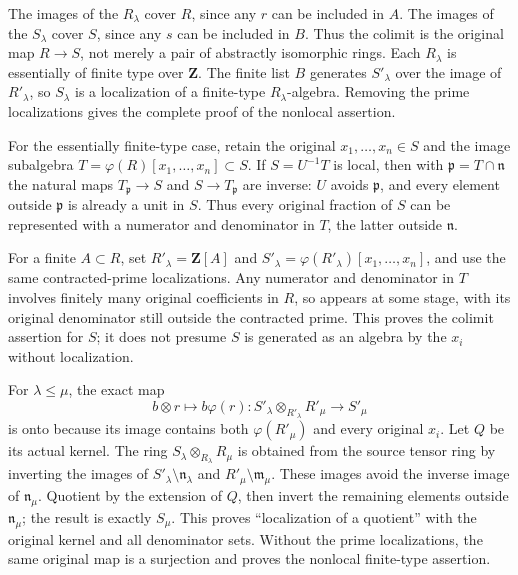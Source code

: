 The images of the \(R_\lambda\) cover \(R\), since any \(r\) can be included in \(A\). The images of the \(S_\lambda\) cover \(S\), since any \(s\) can be included in \(B\). Thus the colimit is the original map \(R\to S\), not merely a pair of abstractly isomorphic rings. Each \(R_\lambda\) is essentially of finite type over \(\mathbf Z\). The finite list \(B\) generates \(S'_\lambda\) over the image of \(R'_\lambda\), so \(S_\lambda\) is a localization of a finite-type \(R_\lambda\)-algebra. Removing the prime localizations gives the complete proof of the nonlocal assertion.

For the essentially finite-type case, retain the original \(x_1,\ldots,x_n\in S\) and the image subalgebra \(T=\varphi(R)[x_1,\ldots,x_n]\subset S\). If \(S=U^{-1}T\) is local, then with \(\mathfrak p=T\cap\mathfrak n\) the natural maps \(T_{\mathfrak p}\to S\) and \(S\to T_{\mathfrak p}\) are inverse: \(U\) avoids \(\mathfrak p\), and every element outside \(\mathfrak p\) is already a unit in \(S\). Thus every original fraction of \(S\) can be represented with a numerator and denominator in \(T\), the latter outside \(\mathfrak n\).

For a finite \(A\subset R\), set \(R'_\lambda=\mathbf Z[A]\) and \(S'_\lambda=\varphi(R'_\lambda)[x_1,\ldots,x_n]\), and use the same contracted-prime localizations. Any numerator and denominator in \(T\) involves finitely many original coefficients in \(R\), so appears at some stage, with its original denominator still outside the contracted prime. This proves the colimit assertion for \(S\); it does not presume \(S\) is generated as an algebra by the \(x_i\) without localization.

For \(\lambda\le\mu\), the exact map \[
b\otimes r\longmapsto b\varphi(r):
S'_\lambda\otimes_{R'_\lambda}R'_\mu\longrightarrow S'_\mu
\] is onto because its image contains both \(\varphi(R'_\mu)\) and every original \(x_i\). Let \(Q\) be its actual kernel. The ring \(S_\lambda\otimes_{R_\lambda}R_\mu\) is obtained from the source tensor ring by inverting the images of \(S'_\lambda\setminus\mathfrak n_\lambda\) and \(R'_\mu\setminus\mathfrak m_\mu\). These images avoid the inverse image of \(\mathfrak n_\mu\). Quotient by the extension of \(Q\), then invert the remaining elements outside \(\mathfrak n_\mu\); the result is exactly \(S_\mu\). This proves ``localization of a quotient'' with the original kernel and all denominator sets. Without the prime localizations, the same original map is a surjection and proves the nonlocal finite-type assertion.

